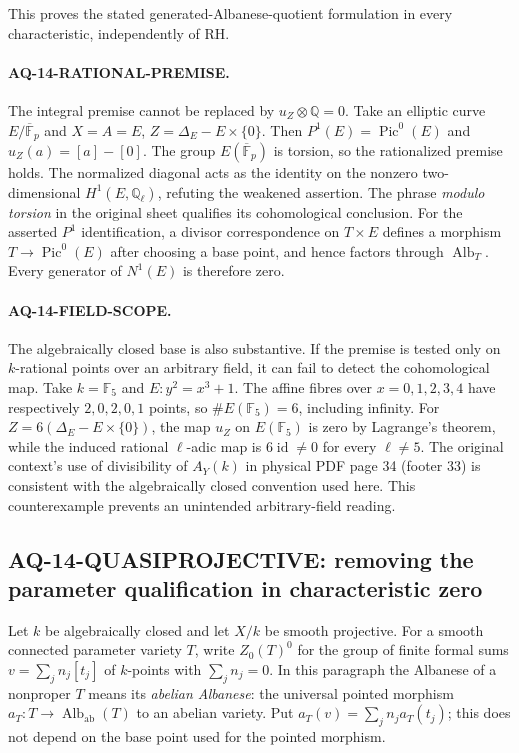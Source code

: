 \documentclass[11pt,a4paper]{article}
\theoremstyle{definition}\newtheorem{definition}[theorem]{Definition}
\theoremstyle{remark}\newtheorem{remark}[theorem]{Remark}
\begin{document}
This proves the stated generated-Albanese-quotient formulation
in every characteristic, independently of RH.

\paragraph{AQ-14-RATIONAL-PREMISE.}
The integral premise cannot be replaced by $u_Z\otimes\mathbb Q=0$.
Take an elliptic curve $E/\overline{\mathbb F}_p$ and
$X=A=E$, $Z=\Delta_E-E\times\{0\}$.
Then $P^1(E)=\operatorname{Pic}^0(E)$ and
$u_Z(a)=[a]-[0]$. The group $E(\overline{\mathbb F}_p)$ is
torsion, so the rationalized premise holds. The normalized
diagonal acts as the identity on the nonzero two-dimensional
$H^1(E,\mathbb Q_\ell)$, refuting the weakened assertion.
The phrase \emph{modulo torsion} in the original sheet
qualifies its cohomological conclusion.
For the asserted $P^1$ identification, a divisor
correspondence on $T\times E$ defines a morphism
$T\to\operatorname{Pic}^0(E)$ after choosing a base point,
and hence factors through $\operatorname{Alb}_T$.
Every generator of $N^1(E)$ is therefore zero.

\paragraph{AQ-14-FIELD-SCOPE.}
The algebraically closed base is also substantive.
If the premise is tested only on $k$-rational points
over an arbitrary field, it can fail to detect the
cohomological map. Take $k=\mathbb F_5$ and
$E:y^2=x^3+1$. The affine fibres over
$x=0,1,2,3,4$ have respectively $2,0,2,0,1$
points, so $\#E(\mathbb F_5)=6$, including infinity.
For $Z=6(\Delta_E-E\times\{0\})$, the map
$u_Z$ on $E(\mathbb F_5)$ is zero by Lagrange's
theorem, while the induced rational $\ell$-adic
map is $6\operatorname{id}\ne0$ for every $\ell\ne5$.
The original context's use of divisibility of
$A_Y(k)$ in physical PDF page 34 (footer 33)
is consistent with the algebraically closed
convention used here. This counterexample prevents
an unintended arbitrary-field reading.

\subsection{AQ-14-QUASIPROJECTIVE: removing the parameter qualification in characteristic zero}
Let $k$ be algebraically closed and let $X/k$ be smooth projective.
For a smooth connected parameter variety $T$, write
$Z_0(T)^0$ for the group of finite formal sums
$v=\sum_jn_j[t_j]$ of $k$-points with $\sum_jn_j=0$.
In this paragraph the Albanese of a nonproper $T$ means its
\emph{abelian Albanese}: the universal pointed morphism
$a_T:T\to\operatorname{Alb}_{\mathrm{ab}}(T)$ to an abelian
variety. Put $a_T(v)=\sum_jn_ja_T(t_j)$; this does not depend
on the base point used for the pointed morphism.
\end{document}
